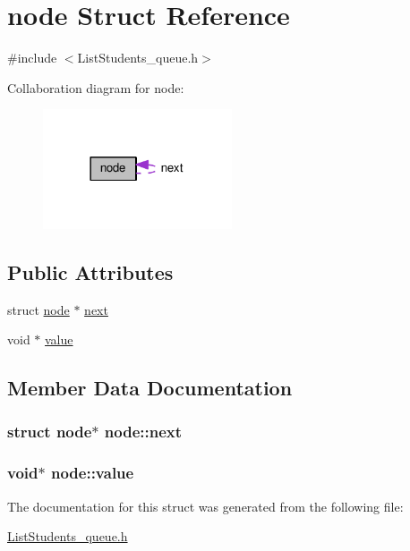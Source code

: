 \hypertarget{structnode}{}\section{node Struct Reference}
\label{structnode}


{\ttfamily \#include $<$List\+Students\+\_\+queue.\+h$>$}



Collaboration diagram for node\+:
\nopagebreak
\begin{figure}[H]
\begin{center}
\leavevmode
\includegraphics[width=158pt]{structnode__coll__graph}
\end{center}
\end{figure}
\subsection*{Public Attributes}
\begin{DoxyCompactItemize}
\item 
struct \hyperlink{structnode}{node} $\ast$ \hyperlink{structnode_aa3e8aa83f864292b5a01210f4453fcc0}{next}
\item 
void $\ast$ \hyperlink{structnode_a288a44aecd04d7839824d50a0b65982e}{value}
\end{DoxyCompactItemize}


\subsection{Member Data Documentation}
\subsubsection[{\texorpdfstring{next}{next}}]{\setlength{\rightskip}{0pt plus 5cm}struct {\bf node}$\ast$ node\+::next}\hypertarget{structnode_aa3e8aa83f864292b5a01210f4453fcc0}{}\label{structnode_aa3e8aa83f864292b5a01210f4453fcc0}
\subsubsection[{\texorpdfstring{value}{value}}]{\setlength{\rightskip}{0pt plus 5cm}void$\ast$ node\+::value}\hypertarget{structnode_a288a44aecd04d7839824d50a0b65982e}{}\label{structnode_a288a44aecd04d7839824d50a0b65982e}


The documentation for this struct was generated from the following file\+:\begin{DoxyCompactItemize}
\item 
\hyperlink{ListStudents__queue_8h}{List\+Students\+\_\+queue.\+h}\end{DoxyCompactItemize}
